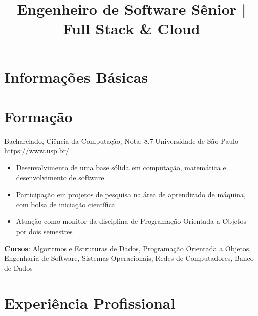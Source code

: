 \documentclass[a4paper, serif, 10pt]{moderncv}
\title{Engenheiro de Software Sênior | Full Stack \& Cloud}
\begin{document}
\maketitle

\section{Informações Básicas}

\section{Formação}

        {Bacharelado, Ciência da Computação, Nota: 8.7}
        {Universidade de São Paulo}
        {\url{https://www.usp.br/}}
        {}
        {\begin{itemize}
\item Desenvolvimento de uma base sólida em computação, matemática e desenvolvimento de software
\item Participação em projetos de pesquisa na área de aprendizado de máquina, com bolsa de iniciação científica
\item Atuação como monitor da disciplina de Programação Orientada a Objetos por dois semestres
\end{itemize}
\textbf{Cursos}: Algoritmos e Estruturas de Dados, Programação Orientada a Objetos, Engenharia de Software, Sistemas Operacionais, Redes de Computadores, Banco de Dados}
\section{Experiência Profissional}
\end{document}
